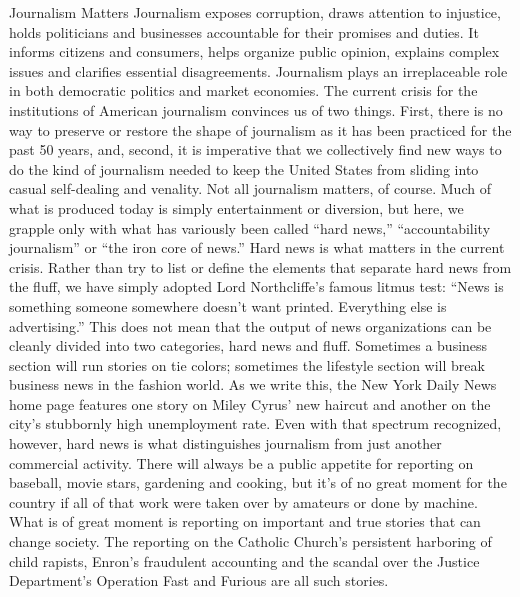 Journalism Matters
Journalism exposes corruption, draws attention to injustice, holds politicians
and businesses accountable for their promises and duties. It informs citizens and
consumers, helps organize public opinion, explains complex issues and clarifies
essential disagreements. Journalism plays an irreplaceable role in both democratic
politics and market economies.
The current crisis for the institutions of American journalism convinces us of
two things. First, there is no way to preserve or restore the shape of journalism
as it has been practiced for the past 50 years, and, second, it is imperative that
we collectively find new ways to do the kind of journalism needed to keep the
United States from sliding into casual self-dealing and venality.
Not all journalism matters, of course. Much of what is produced today is simply
entertainment or diversion, but here, we grapple only with what has variously
been called ``hard news,'' ``accountability journalism'' or ``the iron core of news.''
Hard news is what matters in the current crisis. Rather than try to list or define
the elements that separate hard news from the fluff, we have simply adopted
Lord Northcliffe’s famous litmus test: ``News is something someone somewhere
doesn’t want printed. Everything else is advertising.''
This does not mean that the output of news organizations can be cleanly divided
into two categories, hard news and fluff. Sometimes a business section will run
stories on tie colors; sometimes the lifestyle section will break business news in
the fashion world. As we write this, the New York Daily News home page features
one story on Miley Cyrus’ new haircut and another on the city’s stubbornly
high unemployment rate.
Even with that spectrum recognized, however, hard news is what distinguishes
journalism from just another commercial activity. There will always be a public
appetite for reporting on baseball, movie stars, gardening and cooking, but it’s of
no great moment for the country if all of that work were taken over by amateurs
or done by machine. What is of great moment is reporting on important and true
stories that can change society. The reporting on the Catholic Church’s persistent
harboring of child rapists, Enron’s fraudulent accounting and the scandal over the
Justice Department’s Operation Fast and Furious are all such stories.

